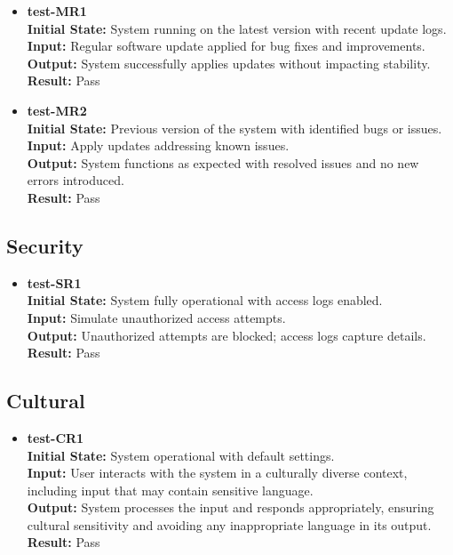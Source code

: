 \documentclass[12pt, titlepage]{article}
\begin{document}
\begin{itemize}
\item \textbf{test-MR1} \label{test-MR1} \\
\textbf{Initial State:} System running on the latest version with recent update logs. \\
\textbf{Input:} Regular software update applied for bug fixes and improvements. \\
\textbf{Output:} System successfully applies updates without impacting stability. \\
\textbf{Result:} Pass \\

\item \textbf{test-MR2} \label{test-MR2} \\
\textbf{Initial State:} Previous version of the system with identified bugs or issues. \\
\textbf{Input:} Apply updates addressing known issues. \\
\textbf{Output:} System functions as expected with resolved issues and no new errors introduced. \\
\textbf{Result:} Pass \\
\end{itemize}

\subsection{Security} \label{section:4.6}

\begin{itemize}
\item \textbf{test-SR1} \label{test-SR1} \\
\textbf{Initial State:} System fully operational with access logs enabled. \\
\textbf{Input:} Simulate unauthorized access attempts. \\
\textbf{Output:} Unauthorized attempts are blocked; access logs capture details. \\
\textbf{Result:} Pass \\
\end{itemize}

\subsection{Cultural} \label{section:4.7}

\begin{itemize}
\item \textbf{test-CR1} \label{test-CR1} \\
\textbf{Initial State:} System operational with default settings. \\
\textbf{Input:} User interacts with the system in a culturally diverse context, including input that may contain sensitive language. \\
\textbf{Output:} System processes the input and responds appropriately, ensuring cultural sensitivity and avoiding any inappropriate language in its output. \\
\textbf{Result:} Pass \\
\end{itemize}
\end{document}
